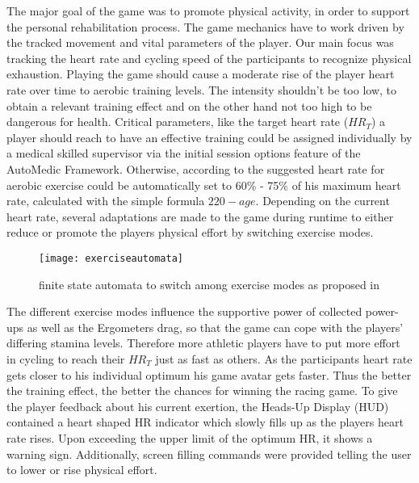 \begin{multicols}{2}
The major goal of the game was to promote physical activity, in order to support the personal rehabilitation process. The game mechanics have to work driven by the tracked movement and vital parameters of the player. Our main focus was tracking the heart rate and cycling speed of the participants to recognize physical exhaustion. Playing the game should cause a moderate rise of the player heart rate over time to aerobic training levels. The intensity shouldn't be too low, to obtain a relevant training effect and on the other hand not too high to be dangerous for health. Critical parameters, like the target heart rate ($HR_T$) a player should reach to have an effective training could be assigned individually by a medical skilled supervisor via the initial session options feature of the AutoMedic Framework.
Otherwise, according to \citet{Buttussi2007} the suggested heart rate for aerobic exercise could be automatically set to 60\% - 75\% of his maximum heart rate, calculated with the simple formula $220-age$.
Depending on the current heart rate, several adaptations are made to the game during runtime to either reduce or promote the players physical effort by switching exercise modes. 
\begin{figure}[H]
  \centering
    \texttt{[image: exerciseautomata]}
 \caption{finite state automata to switch among exercise modes as proposed in \cite{Buttussi2007}}
\end{figure}
The different exercise modes influence the supportive power of collected power-ups as well as the Ergometers drag, so that the game can cope with the players' differing stamina levels. Therefore more athletic players have to put more effort in cycling to reach their $HR_T$ just as fast as others. As the participants heart rate gets closer to his individual optimum his game avatar gets faster. Thus the better the training effect, the better the chances for winning the racing game. 
To give the player feedback about his current exertion, the Heads-Up Display (HUD) contained a heart shaped HR indicator which slowly fills up as the players heart rate rises. Upon exceeding the upper limit of the optimum HR, it shows a warning sign. Additionally, screen filling commands were provided telling the user to lower or rise physical effort.





\end{multicols}
